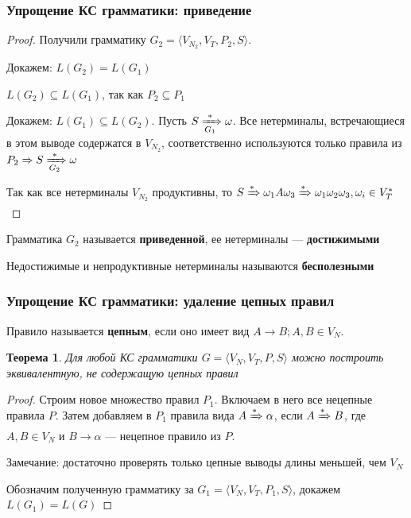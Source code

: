 \documentclass{beamer}
\newtheorem{rutheorem}{Теорема}
\newcommand{\derive}[0]{\xRightarrow[]{*}}
\newcommand{\deriveg}[1]{\xRightarrow[#1]{*}}
\begin{document}
\begin{frame}[fragile]
  \transwipe[direction=90]
  \frametitle{Упрощение КС грамматики: приведение}
   \begin{proof}
   Получили грамматику $G_2 = \langle V_{N_2}, V_T, P_2, S\rangle$. 

   Докажем: $L(G_2) = L(G_1)$
   
   $L(G_2) \subseteq L(G_1)$, так как $P_2 \subseteq P_1$
   
   Докажем: $L(G_1) \subseteq L(G_2)$. Пусть $S \deriveg{G_1} \omega$. Все нетерминалы, встречающиеся в этом выводе содержатся в $V_{N_2}$, соответственно используются только правила из $ P_2 \Rightarrow S \deriveg{G_2} \omega $
   
   Так как все нетерминалы $V_{N_2}$ продуктивны, то  $S \derive \omega_1 A \omega_3 \derive \omega_1 \omega_2 \omega_3, \omega_i \in V_T^*$
   
   
   \end{proof}
   
   Грамматика $G_2$ называется \textbf{приведенной}, ее нетерминалы --- \textbf{достижимыми}
   
   Недостижимые и непродуктивные нетерминалы называются \textbf{бесполезными}
\end{frame}

\begin{frame}[fragile]
  \transwipe[direction=90]
  \frametitle{Упрощение КС грамматики: удаление цепных правил}
  Правило называется \textbf{цепным}, если оно имеет вид $A \rightarrow B; A, B \in V_N$.
  
  \begin{rutheorem}
    Для любой КС грамматики $G=\langle V_N, V_T, P, S \rangle$ можно построить эквивалентную, не содержащую цепных правил
  \end{rutheorem}
  
   \begin{proof}
   Строим новое множество правил $P_1$. Включаем в него все нецепные правила  $P$. Затем добавляем в $P_1$ правила вида $A \derive \alpha$, если $A \derive B$, где $A, B \in V_N$ и $B \rightarrow \alpha$ --- нецепное правило из $P$.
   
   Замечание: достаточно проверять только цепные выводы длины меньшей, чем $V_N$
   
   Обозначим полученную грамматику за $G_1=\langle V_N, V_T, P_1, S \rangle$, докажем $L(G_1)=L(G)$
      \end{proof}
\end{frame} 
   
\end{document}
